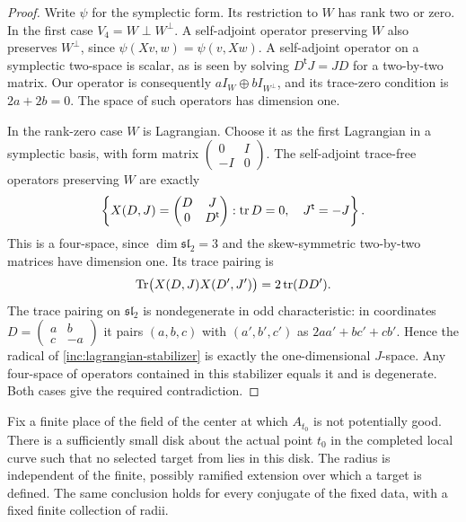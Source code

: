 \begin{proof}
Write $\psi$ for the symplectic form. Its restriction to $W$ has rank
two or zero. In the first
case $V_4=W\perp W^\perp$.  A self-adjoint operator preserving
$W$ also preserves $W^\perp$, since
$\psi(Xv,w)=\psi(v,Xw)$.
A self-adjoint operator on a symplectic two-space is scalar, as is
seen by solving $D^{\mathsf t}J=JD$ for a two-by-two matrix.
Our operator is consequently $aI_W\oplus bI_{W^\perp}$, and its
trace-zero condition is $2a+2b=0$.  The space of such operators has
dimension one.

In the rank-zero case $W$ is Lagrangian.  Choose it as the first
Lagrangian in a symplectic basis, with form matrix
$\left(\begin{smallmatrix}0&I\\-I&0\end{smallmatrix}\right)$.
The self-adjoint trace-free operators preserving $W$ are exactly
\begin{equation}\label{inc:lagrangian-stabilizer}
 \left\{
 X(D,J)=\begin{pmatrix}D&J\\0&D^{\mathsf t}\end{pmatrix}:
 \operatorname{tr} D=0,\quad J^{\mathsf t}=-J
 \right\}.
\end{equation}
This is a four-space, since $\dim\mathfrak{sl}_2=3$ and the
skew-symmetric two-by-two matrices have dimension one.  Its trace
pairing is
\[
 \operatorname{Tr}\bigl(X(D,J)X(D',J')\bigr)=2\operatorname{tr}(DD').
\]
The trace pairing on $\mathfrak{sl}_2$ is nondegenerate in odd
characteristic: in coordinates
$D=\left(\begin{smallmatrix}a&b\\c&-a\end{smallmatrix}\right)$
it pairs $(a,b,c)$ with $(a',b',c')$ as
$2aa'+bc'+cb'$.  Hence the radical of
\eqref{inc:lagrangian-stabilizer} is exactly the one-dimensional
$J$-space.  Any four-space of operators contained in this stabilizer
equals it and is degenerate.  Both cases give the required
contradiction.
\end{proof}

\begin{proposition}\label{inc:bad-disks}
Fix a finite place of the field of the center at which $A_{t_0}$
is not potentially good.  There is a sufficiently small disk about
the actual point $t_0$ in the completed local curve such that no
selected target from  lies in this disk.  The
radius is independent of the finite, possibly ramified extension
over which a target is defined.  The same conclusion holds for
every conjugate of the fixed data, with a fixed finite collection
of radii.
\end{proposition}

